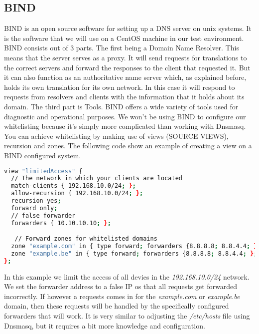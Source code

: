 \subsection{BIND}
BIND is an open source software for setting up a DNS server on unix systems. It is the software that we will use on a CentOS machine in our test environment. BIND consists out of 3 parts. The first being a Domain Name Resolver. This means that the server serves as a proxy. It will send requests for translations to the correct servers and forward the responses to the client that requested it. But it can also function as an authoritative name server which, as explained before, holds its own translation for its own network. In this case it will respond to requests from resolvers and clients with the information that it holds about its domain. The third part is Tools. BIND offers a wide variety of tools used for diagnostic and operational purposes. 
We won't be using BIND to configure our whitelisting because it's simply more complicated than working with Dnsmasq. You can achieve whitelisting by making use of views (SOURCE VIEWS), recursion and zones. The following code show an example of creating a view on a BIND configured system.
\begin{lstlisting}[language=sh]
view "limitedAccess" {
  // The network in which your clients are located
  match-clients { 192.168.10.0/24; };
  allow-recursion { 192.168.10.0/24; };
  recursion yes;
  forward only;
  // false forwarder
  forwarders { 10.10.10.10; };

   // Forward zones for whitelisted domains
  zone "example.com" in { type forward; forwarders {8.8.8.8; 8.8.4.4; }; };
  zone "example.be" in { type forward; forwarders {8.8.8.8; 8.8.4.4; }; };
};
\end{lstlisting}
In this example we limit the access of all devies in the \textit{192.168.10.0/24} network. We set the forwarder address to a false IP os that all requests get forwarded incorrectly. If however a requests comes in for the \textit{example.com} or \textit{example.be} domain, then these requests will be handled by the specifically configured forwarders that will work.
It is very similar to adjusting the \textit{/etc/hosts} file using Dnsmasq, but it requires a bit more knowledge and configuration.
